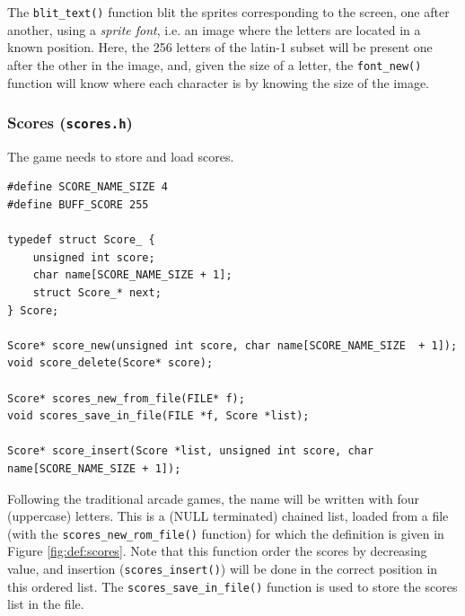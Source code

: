 \documentclass[12pt,a4paper]{article}
\newcommand{\cc}[1]{\texttt{#1}}
\begin{document}
The \cc{blit_text()} function blit the sprites corresponding to the screen, one after another, using a \textit{sprite font}, i.e. an image where the letters are located in a known position. Here, the 256 letters of the latin-1 subset will be present one after the other in the image, and, given the size of a letter, the \cc{font_new()} function will know where each character is by knowing the size of the image.

\subsubsection{Scores (\texttt{scores.h})}

The game needs to store and load scores.

\begin{verbatim}
#define SCORE_NAME_SIZE 4
#define BUFF_SCORE 255

typedef struct Score_ {
    unsigned int score;
    char name[SCORE_NAME_SIZE + 1];
    struct Score_* next;
} Score;

Score* score_new(unsigned int score, char name[SCORE_NAME_SIZE  + 1]);
void score_delete(Score* score);

Score* scores_new_from_file(FILE* f);
void scores_save_in_file(FILE *f, Score *list);

Score* score_insert(Score *list, unsigned int score, char name[SCORE_NAME_SIZE + 1]);
\end{verbatim}

Following the traditional arcade games, the name will be written with four (uppercase) letters. This is a (NULL terminated) chained list, loaded from a file (with the \cc{scores_new_rom_file()} function) for which the definition is given in Figure \ref{fig:def:scores}. Note that this function order the scores by decreasing value, and insertion (\cc{scores_insert()}) will be done in the correct position in this ordered list. The \cc{scores_save_in_file()} function is used to store the scores list in the file.
\end{document}
